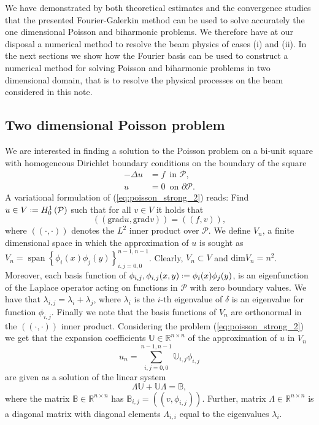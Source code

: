 \documentclass[a4paper,10pt]{article}
\newcommand{\R}{\ensuremath{\mathbb{R}}}
\newcommand{\Inner}[2]{\ensuremath{\left(\left(#1, #2\right)\right)}}
\newcommand{\Grad}[1]{\ensuremath{\text{grad}#1}}
\newcommand*{\defeq}{\mathrel{\vcenter{\baselineskip0.5ex \lineskiplimit0pt
                     \hbox{\scriptsize.}\hbox{\scriptsize.}}}%
                     =}
\DeclareMathOperator{\spn}{span}
\begin{document}
  We have demonstrated by both theoretical estimates and the convergence studies
  that the presented Fourier-Galerkin method can be used to solve accurately 
  the one dimensional Poisson and biharmonic problems. We therefore have at our
  disposal a numerical method to resolve the beam physics of cases (i) and (ii).
  In the next sections we show how the Fourier basis can be used to construct
  a numerical method for solving Poisson and biharmonic problems in two dimensional
  domain, that is to resolve the physical processes on the beam considered
  in this note.

  \subsection{Two dimensional Poisson problem}
  We are interested in finding a solution to the Poisson problem on a bi-unit
  square with homogeneous Dirichlet boundary conditions on the boundary of the
  square
  \begin{equation}
  \label{eq:poisson_strong_2}
  \begin{aligned}
    -\Delta u &= f\,\text{ in }\mathcal{P},\\
            u &= 0\,\text{ on }\partial\mathcal{P}.
  \end{aligned}
  \end{equation}
  A variational formulation of (\ref{eq:poisson_strong_2}) reads: Find $u\in
  V\defeq H^1_0\left(\mathcal{P}\right)$ such that for all $v\in V$ it holds
  that
  \begin{equation}
    \label{eq:poisson_weak_2}
    \Inner{\Grad{u}}{\Grad{v}} = \Inner{f}{v},
  \end{equation}
  where $\Inner{\cdot}{\cdot}$ denotes the $L^2$ inner product over $\mathcal{P}$.
  We define $V_n$, a finite dimensional space in which the approximation of $u$
  is sought as $V_n=\spn\left\{\phi_i(x)\phi_j(y)\right\}_{i, j = 0, 0}^{n-1, n-1}$.
  Clearly, $V_n\subset V$ and $\text{dim}V_n = n^2$. Moreover, each basis function of
  $\phi_{i, j}, \phi_{i, j}(x, y)\defeq\phi_i(x)\phi_j(y)$, is an eigenfunction
  of the Laplace operator acting on functions in $\mathcal{P}$ with zero boundary
  values. We have that $\lambda_{i, j}=\lambda_i + \lambda_j$, where $\lambda_i$
  is the $i$-th eigenvalue of $\delta$ is an eigenvalue for function $\phi_{i, j}$.
  Finally we note that the basis functions of $V_n$ are orthonormal in the
  $\Inner{\cdot}{\cdot}$ inner product. Considering the problem (\ref{eq:poisson_strong_2})
  we get that the expansion coefficients $\mathbb{U}\in\R^{n\times n}$ of the
  approximation of $u$ in $V_n$
  \[
    u_n=\sum\limits_{i, j = 0, 0}^{n-1, n-1}\mathbb{U}_{i,
    j}\phi_{i, j}
  \]
  are given as a solution of the linear system
  \begin{equation}
    \label{eq:p_sys}
    \Lambda\mathbb{U} + \mathbb{U}\Lambda = \mathbb{B},
  \end{equation}
  where the matrix $\mathbb{B}\in\R^{n\times n}$ has $\mathbb{B}_{i,
  j}=\Inner{v}{\phi_{i, j}}$. Further, matrix $\Lambda\in\R^{n\times n}$ is
  a diagonal matrix with diagonal elements $\Lambda_{i, i}$ equal to the
  eigenvalues $\lambda_i$.
  
\end{document}

